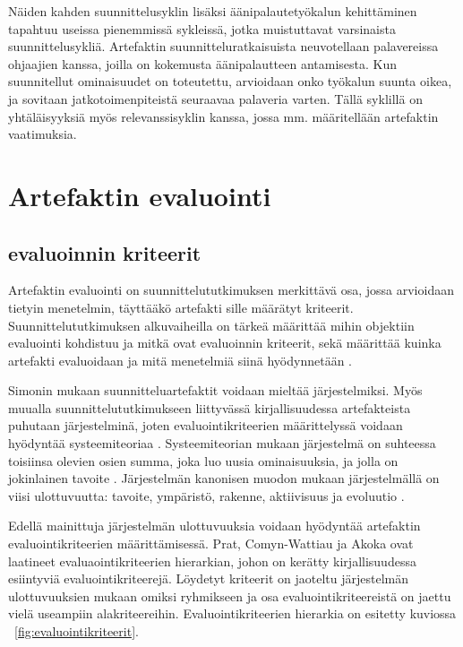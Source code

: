 \documentclass[utf8]{gradu3}
\begin{document}
Näiden kahden suunnittelusyklin lisäksi äänipalautetyökalun kehittäminen tapahtuu useissa pienemmissä sykleissä, jotka muistuttavat varsinaista suunnittelusykliä. Artefaktin suunnitteluratkaisuista neuvotellaan palavereissa ohjaajien kanssa, joilla on kokemusta äänipalautteen antamisesta. Kun suunnitellut ominaisuudet on toteutettu, arvioidaan onko työkalun suunta oikea, ja sovitaan jatkotoimenpiteistä seuraavaa palaveria varten. Tällä syklillä on yhtäläisyyksiä myös relevanssisyklin kanssa, jossa mm. määritellään artefaktin vaatimuksia.

\section{Artefaktin evaluointi}

\subsection{evaluoinnin kriteerit}
\label{kriteerit}

Artefaktin evaluointi on suunnittelututkimuksen merkittävä osa, jossa arvioidaan tietyin menetelmin, täyttääkö artefakti sille määrätyt kriteerit. Suunnittelututkimuksen alkuvaiheilla on tärkeä määrittää mihin objektiin evaluointi kohdistuu ja mitkä ovat evaluoinnin kriteerit, sekä määrittää kuinka artefakti evaluoidaan ja mitä menetelmiä siinä hyödynnetään \parencite[][]{evaluation}. 

Simonin \parencite[][]{simon1996} mukaan suunnitteluartefaktit voidaan mieltää järjestelmiksi. Myös muualla suunnittelututkimukseen liittyvässä kirjallisuudessa artefakteista puhutaan järjestelminä, joten evaluointikriteerien määrittelyssä voidaan hyödyntää systeemiteoriaa \parencite[][]{evaluation}. Systeemiteorian mukaan järjestelmä on suhteessa toisiinsa olevien osien summa, joka luo uusia ominaisuuksia, ja jolla on jokinlainen tavoite \parencite[][]{skyttner}. Järjestelmän kanonisen muodon mukaan järjestelmällä on viisi ulottuvuutta: tavoite, ympäristö, rakenne, aktiivisuus ja evoluutio \parencite[][]{modeling, systemic}.

Edellä mainittuja järjestelmän ulottuvuuksia voidaan hyödyntää artefaktin evaluointikriteerien määrittämisessä.  Prat, Comyn-Wattiau ja Akoka \parencite[][]{evaluation} ovat laatineet evaluaointikriteerien hierarkian, johon on kerätty kirjallisuudessa esiintyviä evaluointikriteerejä. Löydetyt kriteerit on jaoteltu järjestelmän ulottuvuuksien mukaan omiksi ryhmikseen ja osa evaluointikriteereistä on jaettu vielä useampiin alakriteereihin. Evaluointikriteerien hierarkia on esitetty kuviossa ~\ref{fig:evaluointikriteerit}.
\end{document}
